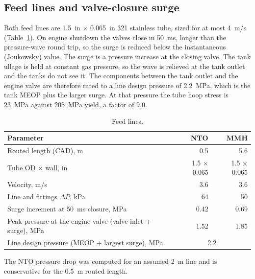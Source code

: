 \documentclass[10pt]{article}
\begin{document}
\subsection{Feed lines and valve-closure surge}
Both feed lines are 1.5~in $\times$ 0.065~in 321 stainless tube, sized for at most 4~m/s (Table~\ref{tab:lines}). On
engine shutdown the valves close in 50~ms, longer than the pressure-wave round trip, so the surge is reduced below the
instantaneous (Joukowsky) value. The surge is a pressure increase at the closing valve. The tank ullage is held at
constant gas pressure, so the wave is relieved at the tank outlet and the tanks do not see it. The components between
the tank outlet and the engine valve are therefore rated to a line design pressure of 2.2~MPa, which is the tank MEOP
plus the larger surge. At that pressure the tube hoop stress is 23~MPa against 205~MPa yield, a factor of 9.0.

\begin{table}[H]\centering\small\caption{Feed lines.}\label{tab:lines}
\begin{tabular}{lrr}\toprule
Parameter & NTO & MMH \\\midrule
Routed length (CAD), m & 0.5 & 5.6 \\
Tube OD $\times$ wall, in & 1.5 $\times$ 0.065 & 1.5 $\times$ 0.065 \\
Velocity, m/s & 3.6 & 3.6 \\
Line and fittings $\Delta P$, kPa & 64 & 50 \\
Surge increment at 50~ms closure, MPa & 0.42 & 0.69 \\
Peak pressure at the engine valve (valve inlet + surge), MPa & 1.52 & 1.85 \\
Line design pressure (MEOP + largest surge), MPa & \multicolumn{2}{c}{2.2} \\
\bottomrule\end{tabular}\end{table}
The NTO pressure drop was computed for an assumed 2~m line and is conservative for the 0.5~m routed length.
\end{document}
